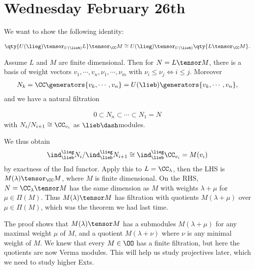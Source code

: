 \hypertarget{wednesday-february-26th}{%
\section{Wednesday February 26th}\label{wednesday-february-26th}}

We want to show the following identity:

\begin{align*}
\qty{ U(\lieg) \tensor_{U(\lieb)} L } \tensor_\CC M 
\cong
U(\lieg) \tensor_{U(\lieb)} \qty{ L \tensor_\CC M  }
.\end{align*}

Assume \(L\) and \(M\) are finite dimensional. Then for
\(N = L \tensor M\), there is a basis of weight vectors
\(v_1, \cdots, v_n, \nu_1, \cdots, \nu_m\) with
\(\nu_i \leq \nu_j \iff i\leq j\). Moreover
\begin{align*}N_k = \CC \generators{v_k, \cdots, v_n} = U(\lieb)\generators{v_k, \cdots, v_n},\end{align*}
and we have a natural filtration

\begin{align*}
0 \subset N_n \subset \cdots \subset N_1 = N
\end{align*} with \(N_i / N_{i+1} \cong \CC_{v_i}\) as
\(\lieb\dash\)modules.

We thus obtain
\begin{align*}\ind_\lieb^\lieg N_i / \ind_\lieb^\lieg N_{i+1} \cong \ind_\lieb^\lieg \CC_{v_i} = M(v_i)\end{align*}
by exactness of the Ind functor. Apply this to \(L = \CC_\lambda\), then
the LHS is \(M(\lambda) \tensor_\CC M\), where \(M\) is finite
dimensional. On the RHS, \(N = \CC_\lambda \tensor M\) has the same
dimension as \(M\) with weights \(\lambda + \mu\) for
\(\mu \in \Pi(M)\). Thus \(M(\lambda) \tensor M\) has filtration with
quotients \(M(\lambda + \mu)\) over \(\mu \in \Pi(M)\), which was the
theorem we had last time.

\begin{description}
\tightlist
\item[Remark]
The proof shows that \(M(\lambda) \tensor M\) has a submodules
\(M(\lambda + \mu)\) for any maximal weight \(\mu\) of \(M\), and a
quotient \(M(\lambda + \nu)\) where \(\nu\) is any minimal weight of
\(M\). We knew that every \(M\in \OO\) has a finite filtration, but here
the quotients are now Verma modules. This will help us study projectives
later, which we need to study higher Exts.
\end{description}

